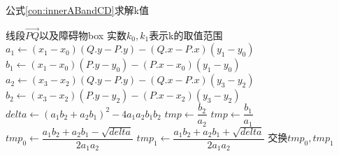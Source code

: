 \begin{algorithm}[!htb]
    \caption{公式\ref{con:innerABandCD}求解k值}
    \label{alg::check_insect_firstcross}
    \begin{algorithmic}[1]
        \Require 线段$\vec{PQ}$以及障碍物box
        \Ensure 实数$k_0,k_1$表示k的取值范围
            \State $a_1 \gets (x_1-x_0)(Q.y-P.y)-(Q.x-P.x)(y_1-y_0)$
            \State $b_1 \gets (x_1-x_0)(P.y-y_0)-(P.x-x_0)(y_1-y_0)$
            \State $a_2 \gets (x_3-x_2)(Q.y-P.y)-(Q.x-P.x)(y_3-y_2)$
            \State $b_2 \gets (x_3-x_2)(P.y-y_2)-(P.x-x_2)(y_3-y_2)$
            \State $delta \gets (a_1b_2+a_2b_1)^2-4a_1a_2b_1b_2$
                \State {}
            \EndIf
                    \State {}
                \EndIf
                \State $tmp \gets \dfrac{b_2}{a_2}$
                    \State {}
                \EndIf
                \State $tmp \gets \dfrac{b_1}{a_1}$
                    \State {}
                \EndIf
            \Else
                \State $tmp_0 \gets \dfrac{a_1b_2+a_2b_1-\sqrt{delta}}{2a_1a_2}$
                \State $tmp_1 \gets \dfrac{a_1b_2+a_2b_1+\sqrt{delta}}{2a_1a_2}$
                    \State 交换$tmp_0,tmp_1$
                \EndIf
                \State {}
            \EndIf
        \EndFunction
    \end{algorithmic}
\end{algorithm}

